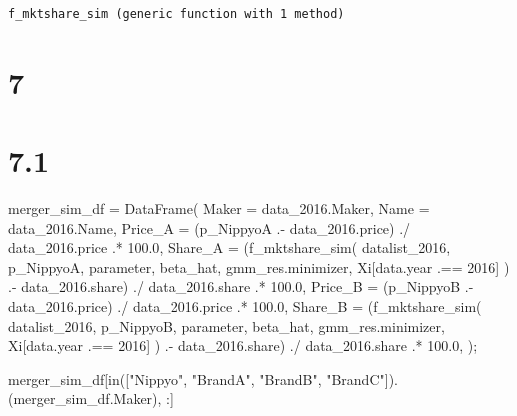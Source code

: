 \documentclass[
  letterpaper,
  DIV=11,
  numbers=noendperiod]{scrreprt}
\newenvironment{Shaded}{\begin{snugshade}}{\end{snugshade}}
\newcommand{\FloatTok}[1]{\textcolor[rgb]{0.68,0.00,0.00}{#1}}
\newcommand{\FunctionTok}[1]{\textcolor[rgb]{0.28,0.35,0.67}{#1}}
\newcommand{\NormalTok}[1]{\textcolor[rgb]{0.00,0.23,0.31}{#1}}
\newcommand{\OperatorTok}[1]{\textcolor[rgb]{0.37,0.37,0.37}{#1}}
\newcommand{\StringTok}[1]{\textcolor[rgb]{0.13,0.47,0.30}{#1}}
\begin{document}
\begin{verbatim}
f_mktshare_sim (generic function with 1 method)
\end{verbatim}

\hypertarget{section-13}{%
\section{7}\label{section-13}}

\hypertarget{section-14}{%
\section{7.1}\label{section-14}}

\begin{Shaded}
\begin{Highlighting}[]
\NormalTok{merger\_sim\_df }\OperatorTok{=} \FunctionTok{DataFrame}\NormalTok{(}
\NormalTok{    Maker }\OperatorTok{=}\NormalTok{ data\_2016.Maker, }
\NormalTok{    Name }\OperatorTok{=}\NormalTok{ data\_2016.Name, }
\NormalTok{    Price\_A }\OperatorTok{=}\NormalTok{ (p\_NippyoA }\OperatorTok{.{-}}\NormalTok{ data\_2016.price) }\OperatorTok{./}\NormalTok{ data\_2016.price }\OperatorTok{.*} \FloatTok{100.0}\NormalTok{,}
\NormalTok{    Share\_A }\OperatorTok{=}\NormalTok{ (}\FunctionTok{f\_mktshare\_sim}\NormalTok{(}
\NormalTok{                datalist\_2016,}
\NormalTok{                p\_NippyoA,}
\NormalTok{                parameter,}
\NormalTok{                beta\_hat,}
\NormalTok{                gmm\_res.minimizer,}
\NormalTok{                Xi[data.year }\OperatorTok{.==} \FloatTok{2016}\NormalTok{]}
\NormalTok{            ) }\OperatorTok{.{-}}\NormalTok{ data\_2016.share) }\OperatorTok{./}\NormalTok{ data\_2016.share }\OperatorTok{.*} \FloatTok{100.0}\NormalTok{,}
\NormalTok{    Price\_B }\OperatorTok{=}\NormalTok{ (p\_NippyoB }\OperatorTok{.{-}}\NormalTok{ data\_2016.price) }\OperatorTok{./}\NormalTok{ data\_2016.price }\OperatorTok{.*} \FloatTok{100.0}\NormalTok{,}
\NormalTok{    Share\_B }\OperatorTok{=}\NormalTok{ (}\FunctionTok{f\_mktshare\_sim}\NormalTok{(}
\NormalTok{                datalist\_2016,}
\NormalTok{                p\_NippyoB,}
\NormalTok{                parameter,}
\NormalTok{                beta\_hat,}
\NormalTok{                gmm\_res.minimizer,}
\NormalTok{                Xi[data.year }\OperatorTok{.==} \FloatTok{2016}\NormalTok{]}
\NormalTok{            ) }\OperatorTok{.{-}}\NormalTok{ data\_2016.share) }\OperatorTok{./}\NormalTok{ data\_2016.share }\OperatorTok{.*} \FloatTok{100.0}\NormalTok{,}
\NormalTok{);}

\NormalTok{merger\_sim\_df[}\FunctionTok{in}\NormalTok{([}\StringTok{"Nippyo"}\NormalTok{, }\StringTok{"BrandA"}\NormalTok{, }\StringTok{"BrandB"}\NormalTok{, }\StringTok{"BrandC"}\NormalTok{]).(merger\_sim\_df.Maker), }\OperatorTok{:}\NormalTok{]}
\end{Highlighting}
\end{Shaded}
\end{document}
